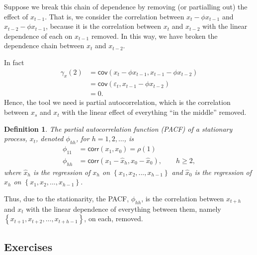 \documentclass[
paper=128mm:96mm, %
fontsize=9.5pt, %
pagesize, %
parskip=half-, %
]{scrartcl} %
\def\qmo{``}
\def\qmcsp{'' }
\theoremstyle{mythmstyle} %
\newtheorem{definition}[theorem]{Definition} %
\def\qmo{``}
\def\qmcsp{'' }
\begin{document}
Suppose we break this chain of dependence by removing (or partialling out) the effect of $x_{t-1}$. That is, we consider the correlation between $x_{t}-\phi x_{t-1}$ and $x_{t-2}-\phi x_{t-1}$, because it is the correlation between $x_t$ and $x_{t-2}$ with the linear dependence of each on $x_{t-1}$ removed. In this way, we have broken the dependence chain between $x_t$ and $x_{t-2}$. 

In fact
%
\begin{align}
\gamma_{x}(2)&=\mathsf{cov}\left(x_{t}-\phi x_{t-1},x_{t-1}-\phi x_{t-2}\right)\nonumber\\
&=\mathsf{cov}\left(\varepsilon_t,x_{t-1}-\phi x_{t-2}\right)\nonumber\\
&=0.\nonumber
\end{align}
%
Hence, the tool we need is partial autocorrelation, which is the correlation
between $x_s$ and $x_t$ with the linear effect of everything \qmo in the middle\qmcsp removed.

\clearpage

\begin{definition}
The partial autocorrelation function (PACF) of a stationary
process, $x_t$, denoted $\phi_{hh}$, for $h = 1,2,\dots$, is
%
\begin{align}
\phi_{11}&=\mathsf{corr}\left(x_1,x_0\right)=\rho(1)\nonumber\\
%
\phi_{hh}&=\mathsf{corr}\left(x_1-\widehat{x}_h,x_0-\widehat{x}_0\right),\qquad h\geq 2,\nonumber
\end{align}
%
where $\widehat{x}_h$ is the regression of $x_h$ on $\left\{x_1, x_2, . . . , x_{h-1}\right\}$ and $\widehat{x}_0$ is the regression of $x_h$ on $\left\{x_1, x_2, . . . , x_{h-1}\right\}$.
\end{definition}

Thus, due to the stationarity, the PACF, $\phi_{hh}$, is the correlation between $x_{t+h}$ and $x_t$ with the linear dependence of everything between them, namely $\left\{x_{t+1},x_{t+2},\dots,x_{t+h-1}\right\}$, on each, removed.
\clearpage



\subsection{Exercises}
\end{document}
